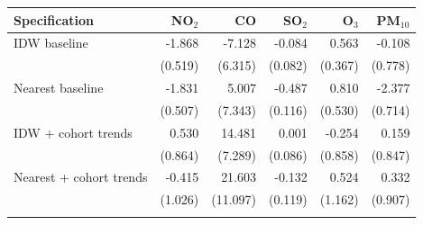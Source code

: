 \begin{tabular}{lrrrrr}
\toprule
Specification & NO$_2$ & CO & SO$_2$ & O$_3$ & PM$_{10}$ \\
\midrule
IDW baseline & -1.868 & -7.128 & -0.084 & 0.563 & -0.108 \\
 & (0.519) & (6.315) & (0.082) & (0.367) & (0.778) \\
\addlinespace[3pt]
Nearest baseline & -1.831 & 5.007 & -0.487 & 0.810 & -2.377 \\
 & (0.507) & (7.343) & (0.116) & (0.530) & (0.714) \\
\addlinespace[3pt]
IDW + cohort trends & 0.530 & 14.481 & 0.001 & -0.254 & 0.159 \\
 & (0.864) & (7.289) & (0.086) & (0.858) & (0.847) \\
\addlinespace[3pt]
Nearest + cohort trends & -0.415 & 21.603 & -0.132 & 0.524 & 0.332 \\
 & (1.026) & (11.097) & (0.119) & (1.162) & (0.907) \\
\addlinespace[3pt]
\bottomrule
\end{tabular}
